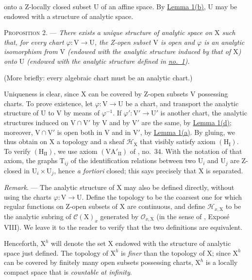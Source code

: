 onto a Z-locally closed subset $\mathrm{U}$ of an affine space. By \hyperref[gaga:lemma:1:item:b]{Lemma 1(b)}, $\mathrm{U}$ may be endowed with a structure of analytic space.

\textsc{Proposition 2}. --- \emph{There exists a unique structure of analytic space on $\mathrm{X}$ such that, for every chart $\varphi:\mathrm{V}\to\mathrm{U}$, the Z-open subset $\mathrm{V}$ is open and $\varphi$ is an analytic isomorphism from $\mathrm{V}$ (endowed with the analytic structure induced by that of $\mathrm{X}$) onto $\mathrm{U}$ (endowed with the analytic structure defined in \hyperref[gaga:no:1]{no.~1}).}

(More briefly: every algebraic chart must be an analytic chart.)

Uniqueness is clear, since $\mathrm{X}$ can be covered by Z-open subsets $\mathrm{V}$ possessing charts. To prove existence, let $\varphi:\mathrm{V}\to\mathrm{U}$ be a chart, and transport the analytic structure of $\mathrm{U}$ to $\mathrm{V}$ by means of $\varphi^{-1}$. If $\varphi':\mathrm{V}'\to\mathrm{U}'$ is another chart, the analytic structures induced on $\mathrm{V}\cap\mathrm{V}'$ by $\mathrm{V}$ and by $\mathrm{V}'$ are the same, by \hyperref[gaga:lemma:1:item:d]{Lemma 1(d)}; moreover, $\mathrm{V}\cap\mathrm{V}'$ is open both in $\mathrm{V}$ and in $\mathrm{V}'$, by \hyperref[gaga:lemma:1:item:a]{Lemma 1(a)}. By gluing, we thus obtain on $\mathrm{X}$ a topology and a sheaf $\mathcal{H}_{\mathrm{X}}$ that visibly satisfy axiom $(\mathrm{H}_{\mathrm{I}})$. To verify $(\mathrm{H}_{\mathrm{II}})$, we use axiom $(\mathrm{VA}'_{\mathrm{II}})$ of , no.~34. With the notation of that axiom, the graphs $\mathrm{T}_{ij}$ of the identification relations between two $\mathrm{U}_i$ and $\mathrm{U}_j$ are Z-closed in $\mathrm{U}_i\times\mathrm{U}_j$, hence \emph{a fortiori} closed; this says precisely that $\mathrm{X}$ is separated.

\emph{Remark}. --- The analytic structure of $\mathrm{X}$ may also be defined directly, without using the charts $\varphi:\mathrm{V}\to\mathrm{U}$.
%
Define the topology to be the coarsest one for which regular functions on Z-open subsets of $\mathrm{X}$ are continuous, and define $\mathcal{H}_{x,\mathrm{X}}$ to be the analytic subring of $\mathcal{C}(\mathrm{X})_x$ generated by $\mathcal{O}_{x,\mathrm{X}}$ (in the sense of , Expos\'e VIII). We leave it to the reader to verify that the two definitions are equivalent.

Henceforth, $\mathrm{X}^h$ will denote the set $\mathrm{X}$ endowed with the structure of analytic space just defined. The topology of $\mathrm{X}^h$ is \emph{finer} than the topology of $\mathrm{X}$; since $\mathrm{X}^h$ can be covered by finitely many open subsets possessing charts, $\mathrm{X}^h$ is a locally compact space that is \emph{countable at infinity}.

